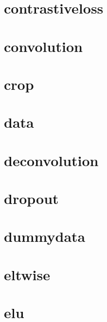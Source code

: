 \documentclass[twoside]{book}
\newcommand{\+}{\discretionary{\mbox{\scriptsize$\hookleftarrow$}}{}{}}
\begin{document}
\chapter{contrastiveloss}
\label{md_docs_tutorial_layers_contrastiveloss}

\chapter{convolution}
\label{md_docs_tutorial_layers_convolution}

\chapter{crop}
\label{md_docs_tutorial_layers_crop}

\chapter{data}
\label{md_docs_tutorial_layers_data}

\chapter{deconvolution}
\label{md_docs_tutorial_layers_deconvolution}

\chapter{dropout}
\label{md_docs_tutorial_layers_dropout}

\chapter{dummydata}
\label{md_docs_tutorial_layers_dummydata}

\chapter{eltwise}
\label{md_docs_tutorial_layers_eltwise}

\chapter{elu}
\label{md_docs_tutorial_layers_elu}

\end{document}
